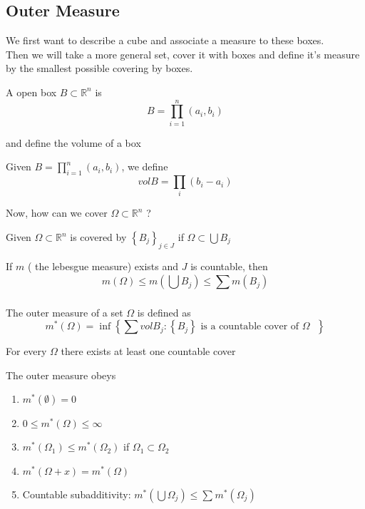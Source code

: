 \documentclass[../main.tex]{subfiles}
\begin{document}
\subsection{Outer Measure}
We first want to describe a cube and associate a measure to these boxes.\\
Then we will take a more general set, cover it with boxes and define it's measure by the smallest possible covering by boxes.
\begin{defn}[Box]
	A open box $B \subset \mathbb{R}^n$ is
	\[ 
	B= \prod_{i=1}^{n}( a_i,b_i) 
	\]
	
\end{defn}
and define the volume of a box
\begin{defn}
	Given $B =\prod_{i=1}^{n}( a_i,b_i) $, we define
	\[ 
	volB = \prod_i ( b_i-a_i) 
	\]
	
\end{defn}
Now, how can we cover $\Omega \subset \mathbb{R}^n$ ?
\begin{defn}
	Given $\Omega \subset \mathbb{R}^n$ is covered by $ \left\{ B_j \right\}_{j\in J} $ if $\Omega \subset \bigcup B_j$ 
\end{defn}
\begin{rmq}
If $m$ ( the lebesgue measure) exists and $J$ is countable, then
\[ 
m( \Omega) \leq m( \bigcup B_j) \leq \sum_{}^{ }m( B_j) 
\]


\end{rmq}
\begin{defn}
The outer measure of a set $\Omega$ is defined as
\[ 
m^{\ast}( \Omega) =\inf \left\{ \sum vol B_j : \left\{ B_j \right\} \text{ is a countable cover of $\Omega$  } \right\} 
\]

\end{defn}
\begin{rmq}
For every $\Omega$ there exists at least one countable cover
\end{rmq}
\begin{lemma}
The outer measure obeys
\begin{enumerate}
\item $m^{*}( \emptyset) =0$ 
\item $0 \leq m^{*}( \Omega) \leq \infty $ 
\item $m^{*}( \Omega_1) \leq m^{*}( \Omega_2) $ if $\Omega_1 \subset \Omega_2$ 

\item $m^{*}( \Omega+x) = m^{*}( \Omega) $ 
\item Countable subadditivity: $m^{*}( \bigcup \Omega_j) \leq \sum_{}^{ } m^{*}( \Omega_j) $ 
\end{enumerate}

\end{lemma}
\end{document}

